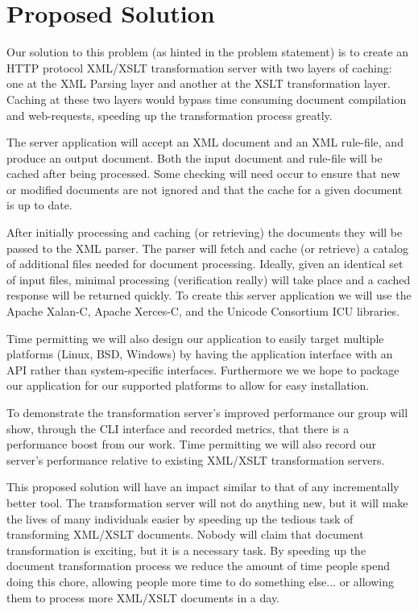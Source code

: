 % 
% 
\section*{Proposed Solution}

Our solution to this problem (as hinted in the problem statement) is to create an HTTP protocol XML/XSLT transformation server with two layers of caching: one at the XML Parsing layer and another at the XSLT transformation layer.
Caching at these two layers would bypass time consuming document compilation and web-requests, speeding up the transformation process greatly.

The server application will accept an XML document and an XML rule-file, and produce an output document.
Both the input document and rule-file will be cached after being processed.
Some checking will need occur to ensure that new or modified documents are not ignored and that the cache for a given document is up to date.

After initially processing and caching (or retrieving) the documents they will be passed to the XML parser.
The parser will fetch and cache (or retrieve) a catalog of additional files needed for document processing.
Ideally, given an identical set of input files, minimal processing (verification really) will take place and a cached response will be returned quickly.
To create this server application we will use the Apache Xalan-C, Apache Xerces-C, and the Unicode Consortium ICU libraries. \cite{xalan,xerces,icu}

Time permitting we will also design our application to easily target multiple platforms (Linux, BSD, Windows) by having the application interface with an API rather than system-specific interfaces.
Furthermore we we hope to package our application for our supported platforms to allow for easy installation.

To demonstrate the transformation server's improved performance our group will show, through the CLI interface and recorded metrics, that there is a performance boost from our work.
Time permitting we will also record our server's performance relative to existing XML/XSLT transformation servers.

This proposed solution will have an impact similar to that of any incrementally better tool.
The transformation server will not do anything new, but it will make the lives of many individuals easier by speeding up the tedious task of transforming XML/XSLT documents.
Nobody will claim that document transformation is exciting, but it is a necessary task.
By speeding up the document transformation process we reduce the amount of time people spend doing this chore, allowing people more time to do something else... or allowing them to process more XML/XSLT documents in a day.

